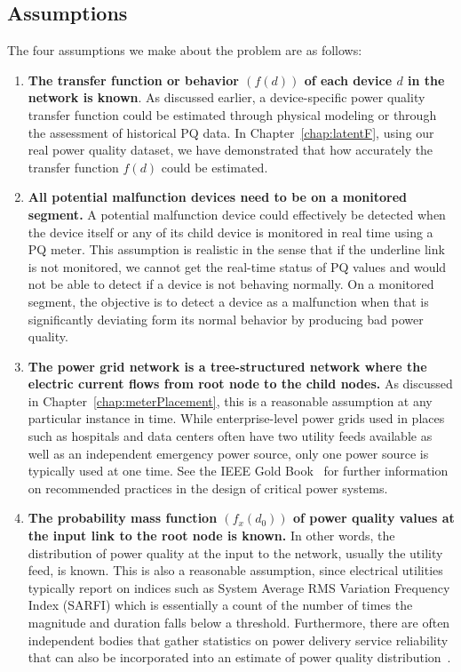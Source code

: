 \subsection{Assumptions}
The four assumptions we make about the problem are as follows:
\begin{enumerate}
\item \textbf{The transfer function or behavior $\left(f\left(d\right)\right)$ of each device $d$ in the network is known}. As discussed earlier, a device-specific power quality transfer function could be estimated through physical modeling or through the assessment of historical PQ data. In Chapter~\ref{chap:latentF}, using our real power quality dataset, we have demonstrated that how accurately the transfer function $f(d)$ could be estimated.

\item \textbf{All potential malfunction devices need to be on a monitored segment.} A potential malfunction device could effectively be detected when the device itself or any of its child device is monitored in real time using a PQ meter. This assumption is realistic in the sense that if the underline link is not monitored, we cannot get the real-time status of PQ values and would not be able to detect if a device is not behaving normally. On a monitored segment, the objective is to detect a device as a malfunction when that is significantly deviating form its normal behavior by producing bad power quality.

\item \textbf{The power grid network is a tree-structured network where the electric current flows from root node to the child nodes.} As discussed in Chapter~\ref{chap:meterPlacement}, this is a reasonable assumption at any particular instance in time. While enterprise-level power grids used in places such as hospitals and data centers often have two utility feeds available as well as an independent emergency power source, only one power source is typically used at one time. See the IEEE Gold Book~\cite{goldbook} for further information on recommended practices in the design of critical power systems.

\item \textbf{The probability mass function $(f_x\left(d_0\right))$ of power quality values at the input link to the root node is known.} In other words, the distribution of power quality at the input to the network, usually the utility feed, is known. This is also a reasonable assumption, since electrical utilities typically report on indices such as System Average RMS Variation Frequency Index (SARFI) which is essentially a count of the number of times the magnitude and duration falls below a threshold. Furthermore, there are often independent bodies that gather statistics on power delivery service reliability that can also be incorporated into an estimate of power quality distribution~\cite{chowdhury2004reliability}.
\end{enumerate}


